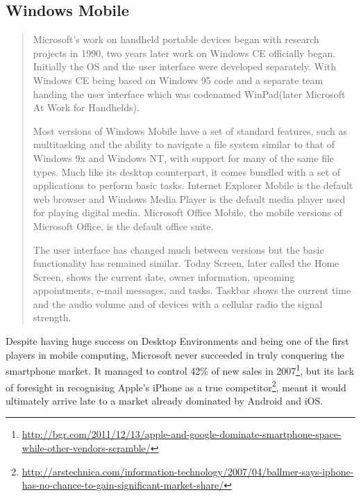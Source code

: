 \subsection{Windows Mobile}
\begin{quotation}
Microsoft's work on handheld portable devices began with research projects in 1990, two years later work on Windows CE officially began. Initially the OS and the user interface were developed separately. With Windows CE being based on Windows 95 code and a separate team handing the user interface which was codenamed WinPad(later Microsoft At Work for Handhelds).

Most versions of Windows Mobile have a set of standard features, such as multitasking and the ability to navigate a file system similar to that of Windows 9x and Windows NT, with support for many of the same file types. Much like its desktop counterpart, it comes bundled with a set of applications to perform basic tasks. Internet Explorer Mobile is the default web browser and Windows Media Player is the default media player used for playing digital media. Microsoft Office Mobile, the mobile versions of Microsoft Office, is the default office suite.

The user interface has changed much between versions but the basic functionality has remained similar. Today Screen, later called the Home Screen, shows the current date, owner information, upcoming appointments, e-mail messages, and tasks. Taskbar shows the current time and the audio volume and of devices with a cellular radio the signal strength.
\cite{wikipedia:windows}
\end{quotation}


Despite having huge success on Desktop Environments and being one of the first players in mobile computing, Microsoft never succeeded in truly conquering the smartphone market. It managed to control 42\% of new sales in 2007\footnote{\url{http://bgr.com/2011/12/13/apple-and-google-dominate-smartphone-space-while-other-vendors-scramble/}}, but its lack of foresight in recognising Apple's iPhone as a true competitor\footnote{\url{http://arstechnica.com/information-technology/2007/04/ballmer-says-iphone-has-no-chance-to-gain-significant-market-share/}}, meant it would ultimately arrive late to a market already dominated by Android and iOS.


